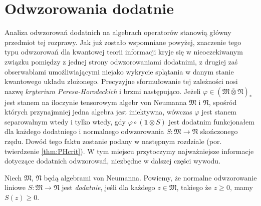 \section{Odwzorowania dodatnie}
Analiza odwzorowań dodatnich na algebrach operatorów stanowią główny przedmiot
tej rozprawy.
Jak już zostało wspomniane powyżej, znaczenie tego typu odwzorowań dla kwantowej
teorii informacji kryje się w nieoczekiwanym związku pomiędzy z jednej strony
odwzorowaniami dodatnimi,
z drugiej zaś obserwablami umożliwiającymi niejako wykrycie splątania w
danym stanie kwantowego układu złożonego.
Precyzyjne sformułowanie tej zależności nosi nazwę
\emph{kryterium Peresa-Horodeckich} i brzmi następująco.
Jeżeli $\varphi \in (\mathfrak{M} \bar{\otimes} \mathfrak{N})_{*}$ jest stanem
na iloczynie tensorowym algebr von Neumanna
$\mathfrak{M}$ i $\mathfrak{N}$,
spośród których przynajmniej jedna algebra jest iniektywna,
wówczas $\varphi$ jest stanem separowalnym wtedy i tylko wtedy,
gdy $\varphi \circ (\mathbf{1} \otimes S)$ jest dodatnim funkcjonałem
dla każdego dodatniego i normalnego odwzorowania
$S: \mathfrak{M} \rightarrow \mathfrak{N}$
skończonego rzędu.
Dowód tego faktu zostanie podany w następnym rozdziale
(por. twierdzenie \ref{thm:PHcrit}).
W tym miejscu przytoczymy najważniejsze informacje dotyczące dodatnich
odwzorowań, niezbędne w dalszej części wywodu.

\begin{Definition}
Niech $\mathfrak{M}$, $\mathfrak{N}$ będą algebrami von Neumanna.
Powiemy, że normalne odwzorowanie liniowe
$S: \mathfrak{M} \rightarrow \mathfrak{N}$
jest \emph{dodatnie},
jeśli dla każdego $z \in \mathfrak{M}$,
takiego że $z \geq 0$, mamy
$S(z) \geq 0$.
\end{Definition}

